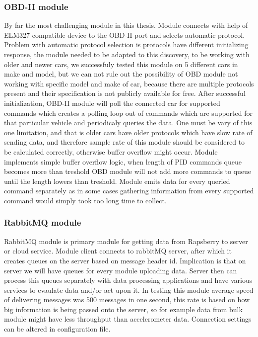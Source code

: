 \subsubsection{OBD-II module} %
By far the most challenging module in this thesis. Module connects with help of ELM327 compatible device to the OBD-II port and selects automatic protocol. Problem with automatic protocol selection is protocols have different initializing response, the module needed to be adapted to this discovery, to be working with older and newer cars, we successfuly tested this module on 5 different cars in make and model, but we can not rule out the possibility of OBD module not working with specific model and make of car, because there are multiple protocols present and their specification is not publicly available for free. After successful initialization, OBD-II module will poll the connected car for supported commands which creates a polling loop out of commands which are supported for that particular vehicle and periodicaly queries the data. One must be vary of this one limitation, and that is older cars have older protocols which have slow rate of sending data, and therefore sample rate of this module should be considered to be calculated correctly, otherwise buffer overflow might occur. Module implements simple buffer overflow logic, when length of PID commands queue becomes more than treshold OBD module will not add more commands to queue until the length lowers than treshold. Module emits data for every queried command separately as in some cases gathering information from every supported command would simply took too long time to collect.
\label{ssub:obd_ii_module}

\subsubsection{RabbitMQ module} %
\label{ssub:rabbitmq_module}
RabbitMQ module is primary module for getting data from Rapsberry to server or cloud service. Module client connects to rabbitMQ server, after which it creates queues on the server based on message header id. Implication is that on server we will have queues for every module uploading data. Server then can process this queues separately with data processing applications and have various services to evaulate data and/or act upon it. In testing this module average speed of delivering messages was 500 messages in one second, this rate is based on how big information is being passed onto the server, so for example data from bulk module might have less throughput than accelerometer data. Connection settings can be altered in configuration file.
